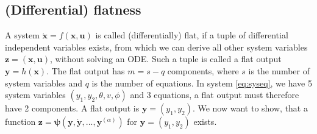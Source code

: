 \documentclass[a4paper,11pt,headings=standardclasses]{scrartcl}%
\newcommand{\uu}{\mathbf{u}}
\newcommand{\x}{\mathbf{x}}
\newcommand{\y}{\mathbf{y}}
\newcommand{\z}{\mathbf{z}}
\begin{document}
\subsection{(Differential) flatness}
A system $\dot{\x}=f(\x,\uu)$ is called (differentially) flat, if a tuple of differential independent variables exists, from which we can derive all other system variables $\z=(\x,\uu)$, without solving an ODE. Such a tuple is called a flat output $\y=h(\x)$. The flat output has $m = s-q$ components, where $s$ is the number of system variables and $q$ is the number of equations. In system \eqref{eq:syseq}, we have 5 system variables $(y_1,y_2, \theta,v, \phi) $ and 3 equations, a flat output must therefore have 2 components. A flat output is $\y=(y_1,y_2)$. We now want to show, that a function $\z = \mathbf{\psi}(\y,\dot{\y},...,\y^{(\alpha)})$ for $\y=(y_1,y_2)$ exists.
\end{document}
